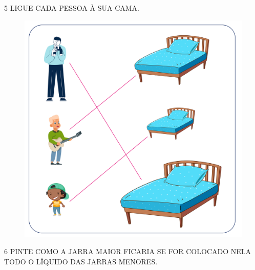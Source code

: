\pagebreak
\num{5} LIGUE CADA PESSOA À SUA CAMA.


\begin{figure}[htpb!]
\centering
\includegraphics[width=.6\textwidth]{./media/SAEB_1ANO_MAT_FIGURA38.png}
\end{figure}


\num{6} PINTE COMO A JARRA MAIOR FICARIA SE FOR COLOCADO NELA TODO O LÍQUIDO DAS JARRAS MENORES.


